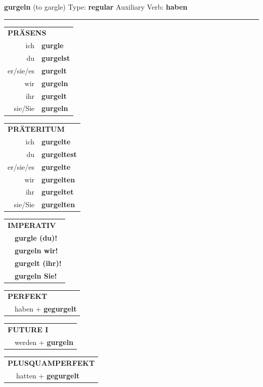 \documentclass[10pt,a4paper]{revtex4-2}
\begin{document}
\begin{verbbox}
{\Large \bf gurgeln} (to gargle) \hfill Type: \textbf{regular} \hfill Auxiliary Verb: \textbf{haben}

\vspace{5pt}
\hrule
\vspace{5pt}

\begin{tabular}{rl}
\multicolumn{2}{l}{\textbf{PRÄSENS}}\\
ich & \textbf{gurgle}\\
du & \textbf{gurgelst}\\
er/sie/es & \textbf{gurgelt}\\
wir & \textbf{gurgeln}\\
ihr & \textbf{gurgelt}\\
sie/Sie & \textbf{gurgeln}\\
\end{tabular}
\hfill
\begin{tabular}{rl}
\multicolumn{2}{l}{\textbf{PRÄTERITUM}}\\
ich & \textbf{gurgelte}\\
du & \textbf{gurgeltest}\\
er/sie/es & \textbf{gurgelte}\\
wir & \textbf{gurgelten}\\
ihr & \textbf{gurgeltet}\\
sie/Sie & \textbf{gurgelten}\\
\end{tabular}
\hfill
\begin{tabular}{rl}
\multicolumn{2}{l}{\textbf{IMPERATIV}}\\
& \textbf{gurgle (du)!}\\
& \textbf{gurgeln wir!}\\
& \textbf{gurgelt (ihr)!}\\
& \textbf{gurgeln Sie!}\\
\end{tabular}

\vspace{10pt}

\begin{tabular}{rl}
\multicolumn{2}{l}{\textbf{PERFEKT}}\\
& haben + \textbf{gegurgelt}\\
\end{tabular}
\hfill
\begin{tabular}{rl}
\multicolumn{2}{l}{\textbf{FUTURE I}}\\
& werden + \textbf{gurgeln}\\
\end{tabular}
\hfill
\begin{tabular}{rl}
\multicolumn{2}{l}{\textbf{PLUSQUAMPERFEKT}}\\
& hatten + \textbf{gegurgelt}\\
\end{tabular}


\end{verbbox}
\end{document}

